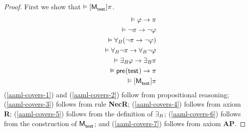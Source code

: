 \begin{proof}
First we show that $\entails \actionA{\aPModel{\aStateTest}} \pi$.
\begin{eqnarray}
    && \entails \phi \implies \pi \label{aaml-covers-1}\\
    && \entails \lnot \pi \implies \lnot \phi \label{aaml-covers-2}\\
    && \entails  \allactsBs (\lnot \pi \implies \lnot \phi) \label{aaml-covers-3}\\
    && \entails  \allactsBs \lnot \pi \implies \allactsBs \lnot \phi \label{aaml-covers-4}\\
    && \entails  \someactsBs \phi \implies \someactsBs \pi \label{aaml-covers-5}\\
    && \entails  \aPrecondition(\aStateTest) \implies \pi \label{aaml-covers-6}\\
    && \entails  \actionA{\aPModel{\aStateTest}} \pi \label{aaml-covers-7}
\end{eqnarray}
(\ref{aaml-covers-1}) and
(\ref{aaml-covers-2}) follow from propositional reasoning;
(\ref{aaml-covers-3}) follows from \axiomAamlK{} rule {\bf NecR};
(\ref{aaml-covers-4}) follows from \axiomAamlK{} axiom {\bf R};
(\ref{aaml-covers-5}) follows from the definition of ${\exists_{B}}$;
(\ref{aaml-covers-6}) follows from the construction of $\aPModel{\aStateTest}$; and
(\ref{aaml-covers-7}) follows from \axiomAamlK{} axiom {\bf AP}.


\end{proof}
